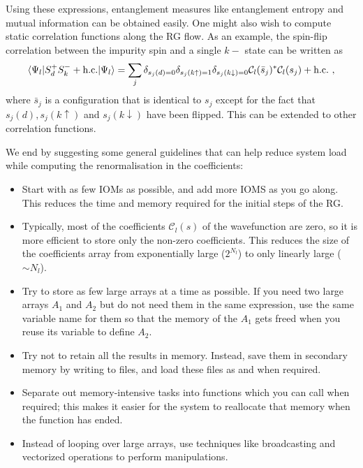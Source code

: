 \documentclass[prb]{revtex4-2}
\begin{document}
Using these expressions, entanglement measures like entanglement entropy and mutual information can be obtained easily. One might also wish to compute static correlation functions along the RG flow. As an example, the spin-flip correlation between the impurity spin and a single \(k-\) state can be written as
\begin{equation}\begin{aligned}
	\braket{\Psi_l | S_d^+S_k^- + \text{h.c.} | \Psi_l} = \sum_j \delta_{s_j(d)=0}\delta_{s_j(k\uparrow)=1}\delta_{s_j(k\downarrow)=0}\mathcal{C}_l(\bar s_j)^*\mathcal{C}_l(s_j) + \text{h.c.}~,
\end{aligned}\end{equation}
where \(\bar s_j\) is a configuration that is identical to \(s_j\) except for the fact that \(s_j(d),s_j(k \uparrow)\) and \(s_j(k \downarrow)\) have been flipped. This can be extended to other correlation functions.

We end by suggesting some general guidelines that can help reduce system load while computing the renormalisation in the coefficients:
\begin{itemize}
	\item Start with as few IOMs as possible, and add more IOMS as you go along. This reduces the time and memory required for the initial steps of the RG.
	\item Typically, most of the coefficients \(\mathcal{C}_l(s)\) of the wavefunction are zero, so it is more efficient to store only the non-zero coefficients. This reduces the size of the coefficients array from exponentially large (\(2^{N_l}\)) to only linearly large (\(\sim N_l\)).
	\item Try to store as few large arrays at a time as possible. If you need two large arrays \(A_1\) and \(A_2\) but do not need them in the same expression, use the same variable name for them so that the memory of the \(A_1\) gets freed when you reuse its variable to define \(A_2\).
	\item Try not to retain all the results in memory. Instead, save them in secondary memory by writing to files, and load these files as and when required.
	\item Separate out memory-intensive tasks into functions which you can call when required; this makes it easier for the system to reallocate that memory when the function has ended.
	\item Instead of looping over large arrays, use techniques like broadcasting and vectorized operations to perform manipulations.

\end{itemize}
\end{document}
